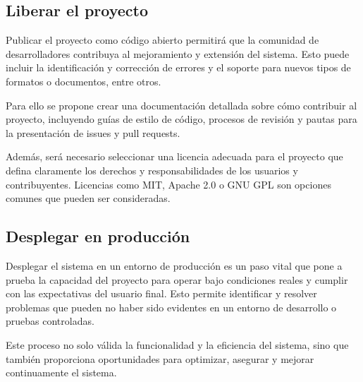 \subsection*{Liberar el proyecto}

Publicar el proyecto como código abierto permitirá que la comunidad de desarrolladores contribuya al mejoramiento y
extensión del sistema.
Esto puede incluir la identificación y corrección de errores y el soporte para nuevos tipos de formatos o documentos,
entre otros.

Para ello se propone crear una documentación detallada sobre cómo contribuir al proyecto, incluyendo guías de estilo
de código, procesos de revisión y pautas para la presentación de issues y pull requests.

Además, será necesario seleccionar una licencia adecuada para el proyecto que defina claramente los derechos y
responsabilidades de los usuarios y contribuyentes.
Licencias como MIT, Apache 2.0 o GNU GPL son opciones comunes que pueden ser consideradas.

\subsection*{Desplegar en producción}

Desplegar el sistema en un entorno de producción es un paso vital que pone a prueba la capacidad del proyecto para
operar bajo condiciones reales y cumplir con las expectativas del usuario final.
Esto permite identificar y resolver problemas que pueden no haber sido evidentes en un entorno de desarrollo o
pruebas controladas.

Este proceso no solo válida la funcionalidad y la eficiencia del sistema, sino que también proporciona oportunidades
para optimizar, asegurar y mejorar continuamente el sistema.
